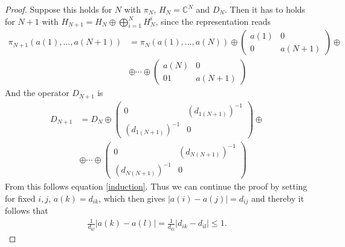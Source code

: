 \begin{proof}
    Suppose this holds for $N$ with $\pi_N$, $H_N = \mathbb{C}^N$ and $D_N$.
    Then it has to holds for $N+1$ with $H_{N+1} = H_{N} \oplus \bigoplus_{i=1}^N
    H_N^i$, since the representation reads
    \begin{align}
        \pi_{N+1}(a(1),\dots,a(N+1)) &= \pi_N(a(1),\dots,a(N))
        \oplus
        \begin{pmatrix}
            a(1) & 0 \\
            0   & a(N+1)
        \end{pmatrix} \oplus \nonumber\\
         &\oplus \cdots \oplus
        \begin{pmatrix}
            a(N) & 0 \\
            0  1 & a(N+1)
        \end{pmatrix}
    \end{align}
    And the operator $D_{N+1}$ is
    \begin{align}
        D_{N+1} &= D_N
        \oplus
        \begin{pmatrix}
            0 & (d_{1(N+1)})^{-1} \\
            (d_{1(N+1)})^{-1}   & 0
        \end{pmatrix}\oplus \nonumber \\
                &\oplus \cdots \oplus
        \begin{pmatrix}
            0 & (d_{N(N+1)})^{-1} \\
            (d_{N(N+1)})^{-1}   & 0
        \end{pmatrix}
    \end{align}
    From this follows equation \eqref{induction}.
    Thus we can continue the proof by setting for fixed $i, j$, $a(k) =
    d_{ik}$, which then gives $|a(i) - a(j)| = d_{ij}$ and thereby it follows
    that
    \begin{align}
        \frac{1}{d_{kl}} \big| a(k) - a(l) \big| =  \frac{1}{d_{kl}} \big|
        d_{ik} - d_{il} \big| \leq 1.
    \end{align}
\end{proof}


